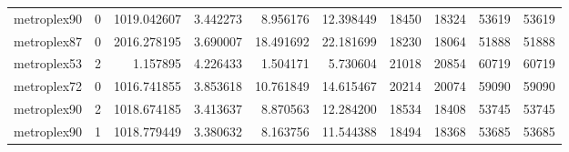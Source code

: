 \begin{longtable}{|l|r|r|r|r|r|r|r|r|r|}
metroplex90 & 0 & 1019.042607 & 3.442273 & 8.956176 & 12.398449 & 18450 & 18324 & 53619 & 53619 \\
metroplex87 & 0 & 2016.278195 & 3.690007 & 18.491692 & 22.181699 & 18230 & 18064 & 51888 & 51888 \\
metroplex53 & 2 & 1.157895 & 4.226433 & 1.504171 & 5.730604 & 21018 & 20854 & 60719 & 60719 \\
metroplex72 & 0 & 1016.741855 & 3.853618 & 10.761849 & 14.615467 & 20214 & 20074 & 59090 & 59090 \\
metroplex90 & 2 & 1018.674185 & 3.413637 & 8.870563 & 12.284200 & 18534 & 18408 & 53745 & 53745 \\
metroplex90 & 1 & 1018.779449 & 3.380632 & 8.163756 & 11.544388 & 18494 & 18368 & 53685 & 53685 \\
\end{longtable}
